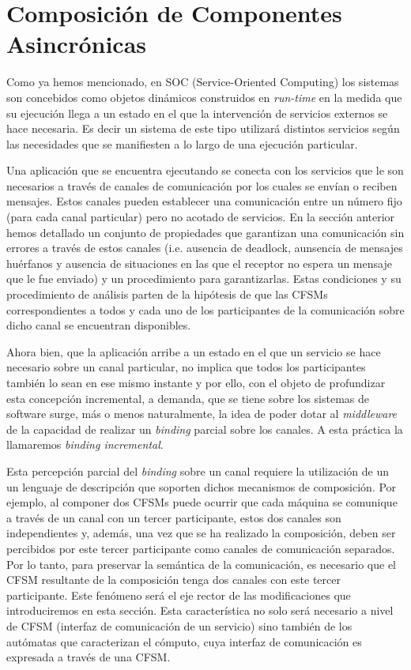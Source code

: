 
\section{Composición de Componentes Asincrónicas}

 Como ya hemos mencionado, en SOC (Service-Oriented Computing) los sistemas son concebidos como objetos dinámicos construidos en \emph{run-time} en la medida que su ejecución llega a un estado en el que la intervención de servicios externos se hace necesaria. Es decir un sistema de este tipo utilizará distintos servicios según las necesidades que se manifiesten a lo largo de una ejecución particular. 
 
 Una aplicación que se encuentra ejecutando se conecta con los servicios que le son necesarios a través de canales de comunicación por los cuales se envían o reciben mensajes. Estos canales pueden establecer una comunicación entre un número fijo (para cada canal particular) pero no acotado de servicios. En la sección anterior hemos detallado un conjunto de propiedades que garantizan una comunicación sin errores a través de estos canales (i.e. ausencia de deadlock, aunsencia de mensajes huérfanos y ausencia de situaciones en las que el receptor no espera un mensaje que le fue enviado) y un procedimiento para garantizarlas. Estas condiciones y su procedimiento de análisis parten de la hipótesis de que las CFSMs correspondientes a todos y cada uno de los participantes de la comunicación sobre dicho canal se encuentran disponibles.

Ahora bien, que la aplicación arribe a un estado en el que un servicio se hace necesario sobre un canal particular, no implica que todos los participantes también lo sean en ese mismo instante y por ello, con el objeto de profundizar esta concepción incremental, a demanda, que se tiene sobre los sistemas de software surge, más o menos naturalmente, la idea de poder dotar al \emph{middleware} de la capacidad de realizar un \emph{binding} parcial sobre los canales. A esta práctica la llamaremos \emph{binding incremental}.
 
Esta percepción parcial del \emph{binding} sobre un canal requiere la utilización de un un lenguaje de descripción que soporten dichos mecanismos de composición. Por ejemplo, al componer dos CFSMs puede ocurrir que cada máquina se comunique a través de un canal con un tercer participante, estos dos canales son independientes y, además, una vez que se ha realizado la composición, deben ser percibidos por este tercer participante como canales de comunicación separados. Por lo tanto, para preservar la semántica de la comunicación, es necesario que el CFSM resultante de la composición tenga dos canales con este tercer participante. Este fenómeno será el eje rector de las modificaciones que introduciremos en esta sección. Esta característica no solo será necesario a nivel de CFSM (interfaz de comunicación de un servicio) sino también de los autómatas que caracterizan el cómputo, cuya interfaz de comunicación es expresada a través de una CFSM.

